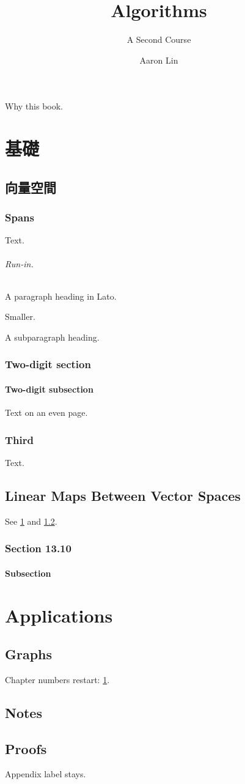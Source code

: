 \documentclass[openright, partreset, chaptername=Lecture]{akizumi-book}
\title{Algorithms}
\subtitle{A Second Course}
\author{Aaron Lin}
\begin{document}
\frontmatter
\maketitle
\preface
Why this book.
\tableofcontents

\mainmatter
\part[sub=Foundations]{基礎}
\chapter[sub=Vector Spaces]{向量空間}\label{ch:vs}
\section{Spans}
Text.
\paragraph{Run-in.} A paragraph heading in Lato.
\subparagraph{Smaller.} A subparagraph heading.
\setcounter{section}{11}
\section{Two-digit section}\label{sec:wide}
\setcounter{subsection}{11}
\subsection{Two-digit subsection}
\clearpage
Text on an even page.
\section{Third}
Text.

\setcounter{chapter}{12}
\chapter[short=Maps]{Linear Maps Between Vector Spaces}
See \cref{ch:vs} and \cref{sec:wide}.
\setcounter{section}{9}
\section{Section 13.10}
\subsection{Subsection}

\part{Applications}
\chapter{Graphs}\label{ch:graphs}
Chapter numbers restart: \cref{ch:graphs}.
\chapter*[sub=Unnumbered]{Notes}

\appendix
\chapter{Proofs}
Appendix label stays.
\end{document}
